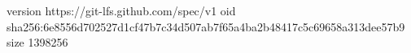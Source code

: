 version https://git-lfs.github.com/spec/v1
oid sha256:6e8556d702527d1cf47b7c34d507ab7f65a4ba2b48417c5c69658a313dee57b9
size 1398256
